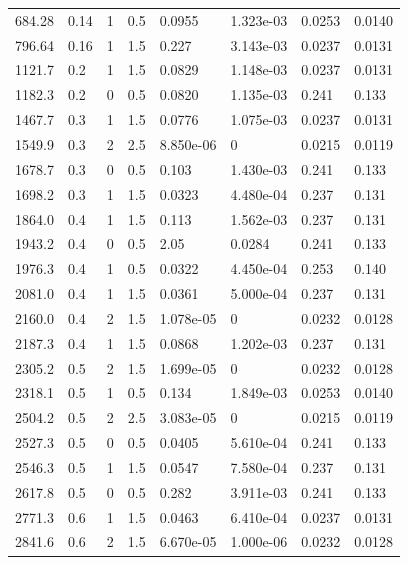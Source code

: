 \documentclass[preview]{standalone}
\begin{document}
{{\begin{tabular}{L{1.2cm}C{1.2cm} C{0.3cm}C{0.5cm} C{1.4cm}C{1.4cm} C{1.4cm}C{1.4cm}}
  684.28  &  0.14  & 1     & 0.5 &  0.0955  & 1.323e-03  & 0.0253 &  0.0140   \\ 
  796.64  &  0.16  & 1     & 1.5 &  0.227  & 3.143e-03  & 0.0237 &  0.0131   \\ 
  1121.7  &   0.2  & 1     & 1.5 &  0.0829  & 1.148e-03  & 0.0237 &  0.0131   \\ 
  1182.3  &   0.2  & 0     & 0.5 &  0.0820  & 1.135e-03  & 0.241 &  0.133   \\ 
  1467.7  &   0.3  & 1     & 1.5 &  0.0776  & 1.075e-03  & 0.0237 &  0.0131   \\ 
  1549.9  &   0.3  & 2     & 2.5 &  8.850e-06  & 0  & 0.0215 &  0.0119   \\ 
  1678.7  &   0.3  & 0     & 0.5 &  0.103  & 1.430e-03  & 0.241 &  0.133   \\ 
  1698.2  &   0.3  & 1     & 1.5 &  0.0323  & 4.480e-04  & 0.237 &  0.131   \\ 
  1864.0  &   0.4  & 1     & 1.5 &  0.113  & 1.562e-03  & 0.237 &  0.131   \\ 
  1943.2  &   0.4  & 0     & 0.5 &  2.05  & 0.0284  & 0.241 &  0.133   \\ 
  1976.3  &   0.4  & 1     & 0.5 &  0.0322  & 4.450e-04  & 0.253 &  0.140   \\ 
  2081.0  &   0.4  & 1     & 1.5 &  0.0361  & 5.000e-04  & 0.237 &  0.131   \\ 
  2160.0  &   0.4  & 2     & 1.5 &  1.078e-05  & 0  & 0.0232 &  0.0128   \\ 
  2187.3  &   0.4  & 1     & 1.5 &  0.0868  & 1.202e-03  & 0.237 &  0.131   \\ 
  2305.2  &   0.5  & 2     & 1.5 &  1.699e-05  & 0  & 0.0232 &  0.0128   \\ 
  2318.1  &   0.5  & 1     & 0.5 &  0.134  & 1.849e-03  & 0.0253 &  0.0140   \\ 
  2504.2  &   0.5  & 2     & 2.5 &  3.083e-05  & 0  & 0.0215 &  0.0119   \\ 
  2527.3  &   0.5  & 0     & 0.5 &  0.0405  & 5.610e-04  & 0.241 &  0.133   \\ 
  2546.3  &   0.5  & 1     & 1.5 &  0.0547  & 7.580e-04  & 0.237 &  0.131   \\ 
  2617.8  &   0.5  & 0     & 0.5 &  0.282  & 3.911e-03  & 0.241 &  0.133   \\ 
  2771.3  &   0.6  & 1     & 1.5 &  0.0463  & 6.410e-04  & 0.0237 &  0.0131   \\ 
  2841.6  &   0.6  & 2     & 1.5 &  6.670e-05  & 1.000e-06  & 0.0232 &  0.0128   \\ 

\end{tabular}}}
\end{document}
